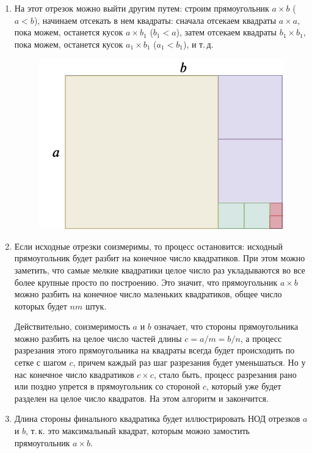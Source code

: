 \begin{enumerate}
\item На этот отрезок можно выйти другим путем: строим прямоугольник $a\times b$ ($a<b$), начинаем отсекать в нем квадраты: сначала отсекаем квадраты $a\times a$, пока можем, останется кусок $a\times b_1$ ($b_1<a$), затем отсекаем квадраты $b_1\times b_1$, пока можем, останется кусок $a_1\times b_1$ ($a_1<b_1$), и т.\,д.
\begin{figure}[hbt!]
\begin{center}
\includegraphics[scale=0.3]{soizmer.png}
\end{center}
\caption{}\label{soizmer}
\end{figure}

\item Если исходные отрезки соизмеримы, то процесс остановится: исходный прямоугольник будет разбит на конечное число квадратиков. При этом можно заметить, что самые мелкие квадратики целое число раз укладываются во все более крупные просто по построению. Это значит, что прямоугольник $a\times b$ можно разбить на конечное число маленьких квадратиков, общее число которых будет $nm$ штук.

Действительно, соизмеримость $a$ и $b$ означает, что стороны прямоугольника можно разбить на целое число частей длины $c=a/m=b/n$, а процесс разрезания этого прямоугольника на квадраты всегда будет происходить по сетке с шагом $c$, причем каждый раз шаг разрезания будет уменьшаться. Но у нас конечное число квадратиков $c\times c$, стало быть, процесс разрезания рано или поздно упрется в прямоугольник со стороной $c$, который уже будет разделен на целое число квадратов. На этом алгоритм и закончится.

\item Длина стороны финального квадратика будет иллюстрировать НОД отрезков $a$ и $b$, т.\,к. это максимальный квадрат, которым можно замостить прямоугольник $a\times b$. 


\end{enumerate}
